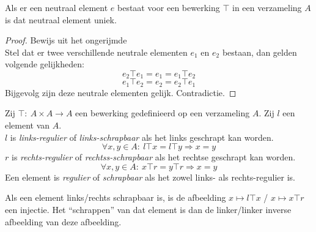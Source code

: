 \documentclass[main.tex]{subfiles}
\begin{document}
\begin{st}
  \label{st:neutraal-element-uniek}
  Als er een neutraal element $e$ bestaat voor een bewerking $\top$ in een verzameling $A$ is dat neutraal element uniek.
  \begin{proof}
    Bewijs uit het ongerijmde\\
    Stel dat er twee verschillende neutrale elementen $e_{1}$ en $e_{2}$ bestaan, dan gelden volgende gelijkheden:
    \[ e_{2}\top e_{1} = e_{1}  =e_{1}\top e_{2}\]
    \[ e_{1}\top e_{2} = e_{2}  =e_{2}\top e_{1}\]
    Bijgevolg zijn deze neutrale elementen gelijk. Contradictie.
  \end{proof}
\end{st}

\begin{de}
  Zij $\top:\ A\times A\rightarrow A$ een bewerking gedefinieerd op een verzameling $A$.
  Zij $l$ een element van $A$.\\
  $l$ is \emph{links-regulier} of \emph{links-schrapbaar} als het links geschrapt kan worden.
  \[ \forall x,y \in A:\ l \top x = l \top y \Rightarrow x = y \]
  $r$ is \emph{rechts-regulier} of \emph{rechtss-schrapbaar} als het rechtse geschrapt kan worden.
  \[ \forall x,y \in A:\ x \top r = y \top r \Rightarrow x = y \]
  Een element is \emph{regulier} of \emph{schrapbaar} als het zowel links- als rechts-regulier is. 
\end{de}

\begin{opm}
  Als een element links/rechts schrapbaar is, is de afbeelding $x \mapsto l\top x$ / $x \mapsto x\top r$ een injectie. Het ``schrappen'' van dat element is dan de linker/linker inverse afbeelding van deze afbeelding.
\end{opm}

\end{document}
